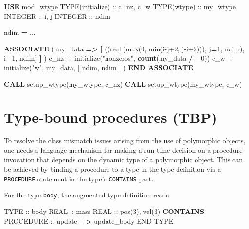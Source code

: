 \documentclass[
  paper=a4,
  ,captions=tableheading
]{scrartcl}
\newenvironment{Shaded}{\begin{snugshade}}{\end{snugshade}}
\newcommand{\DataTypeTok}[1]{\textcolor[rgb]{0.13,0.29,0.53}{#1}}
\newcommand{\DecValTok}[1]{\textcolor[rgb]{0.00,0.00,0.81}{#1}}
\newcommand{\FunctionTok}[1]{\textcolor[rgb]{0.13,0.29,0.53}{\textbf{#1}}}
\newcommand{\KeywordTok}[1]{\textcolor[rgb]{0.13,0.29,0.53}{\textbf{#1}}}
\newcommand{\NormalTok}[1]{#1}
\newcommand{\OperatorTok}[1]{\textcolor[rgb]{0.81,0.36,0.00}{\textbf{#1}}}
\newcommand{\StringTok}[1]{\textcolor[rgb]{0.31,0.60,0.02}{#1}}
\begin{document}
\begin{Shaded}
\begin{Highlighting}[]
\KeywordTok{USE}\NormalTok{ mod\_wtype}
\DataTypeTok{TYPE(initialize)} \DataTypeTok{::}\NormalTok{ c\_nz, c\_w}
\DataTypeTok{TYPE(wtype)} \DataTypeTok{::}\NormalTok{ my\_wtype}
\DataTypeTok{INTEGER} \DataTypeTok{::}\NormalTok{ i, j}
\DataTypeTok{INTEGER} \DataTypeTok{::}\NormalTok{ ndim}

\NormalTok{ndim }\KeywordTok{=}\NormalTok{ ...}

\KeywordTok{ASSOCIATE}\NormalTok{ ( my\_data }\KeywordTok{=}\OperatorTok{\textgreater{}} \KeywordTok{[}\NormalTok{ ((}\DataTypeTok{real (max(0, min(i{-}j+2, j{-}i+2)))}\NormalTok{, j}\KeywordTok{=}\DecValTok{1}\NormalTok{, ndim), i}\KeywordTok{=}\DecValTok{1}\NormalTok{, ndim) }\KeywordTok{]}\NormalTok{ )}
\NormalTok{   c\_nz }\KeywordTok{=}\NormalTok{ initialize(}\StringTok{"nonzeros"}\NormalTok{, }\FunctionTok{count}\NormalTok{(my\_data }\OperatorTok{/=} \DecValTok{0}\NormalTok{))}
\NormalTok{   c\_w }\KeywordTok{=}\NormalTok{ initialize(}\StringTok{"w"}\NormalTok{, my\_data, }\KeywordTok{[}\NormalTok{ ndim, ndim }\KeywordTok{]}\NormalTok{ )}
\KeywordTok{END ASSOCIATE}

\KeywordTok{CALL}\NormalTok{ setup\_wtype(my\_wtype, c\_nz)}
\KeywordTok{CALL}\NormalTok{ setup\_wtype(my\_wtype, c\_w)}
\end{Highlighting}
\end{Shaded}

\section{Type-bound procedures (TBP)}\label{sec:tbp}

To resolve the class mismatch issues arising from the use of polymorphic
objects, one needs a language mechanism for making a run-time decision
on a procedure invocation that depends on the dynamic type of a
polymorphic object. This can be achieved by binding a procedure to a
type in the type definition via a \texttt{PROCEDURE} statement in the
type's \texttt{CONTAINS} part.

For the type \texttt{body}, the augmented type definition reads

\begin{Shaded}
\begin{Highlighting}[]
\DataTypeTok{TYPE} \DataTypeTok{::}\NormalTok{ body}
   \DataTypeTok{REAL} \DataTypeTok{::}\NormalTok{ mass}
   \DataTypeTok{REAL} \DataTypeTok{::}\NormalTok{ pos(}\DecValTok{3}\NormalTok{), vel(}\DecValTok{3}\NormalTok{)}
\KeywordTok{CONTAINS}
   \DataTypeTok{PROCEDURE} \DataTypeTok{::}\NormalTok{ update }\KeywordTok{=}\OperatorTok{\textgreater{}}\NormalTok{ update\_body}
\DataTypeTok{END TYPE}
\end{Highlighting}
\end{Shaded}
\end{document}
